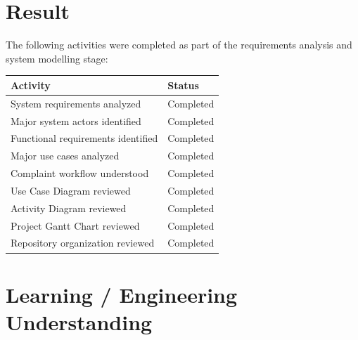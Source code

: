 \documentclass[12pt,a4paper]{article}
\begin{document}

\section{Result}

The following activities were completed as part of the requirements analysis and system modelling stage:

\begin{table}[H]

\centering

\begin{tabular}{p{} p{}}

\toprule

\textbf{Activity} & \textbf{Status} \\

\midrule

System requirements analyzed & Completed \\

Major system actors identified & Completed \\

Functional requirements identified & Completed \\

Major use cases analyzed & Completed \\

Complaint workflow understood & Completed \\

Use Case Diagram reviewed & Completed \\

Activity Diagram reviewed & Completed \\

Project Gantt Chart reviewed & Completed \\

Repository organization reviewed & Completed \\

\bottomrule

\end{tabular}

\end{table}


\section{Learning / Engineering Understanding}
\end{document}
